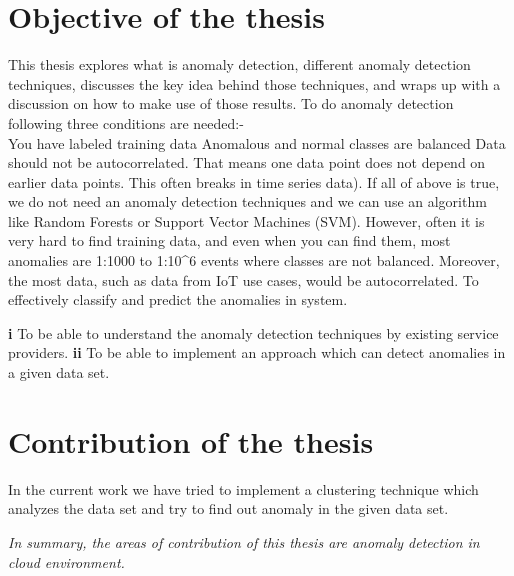 \section{Objective of the thesis}
\label{objective}
This thesis explores what is anomaly detection, different anomaly detection techniques,  discusses the key idea behind those techniques, and wraps up with a discussion on how to make use of those results.\newline%
To do anomaly detection following three conditions are needed:-\\
You have labeled training data
Anomalous and normal classes are balanced 
Data should  not  be autocorrelated.  That means one data point does not depend on earlier data points. This often breaks in time series data).
If all of above is true, we do not need an anomaly detection techniques and we can use an algorithm like Random Forests or Support Vector Machines (SVM).
However, often it is very hard to find training data, and even when you can find them, most anomalies are 1:1000 to 1:10^6 events where classes are not balanced. Moreover, the most data, such as data from IoT use cases, would be autocorrelated.
To effectively classify and predict the anomalies in system.
\begin{itemize}
     \textendash\textbf{i} To be able to understand the anomaly detection techniques by existing service providers.
     \textendash\textbf{ii} To be able to implement an approach which can detect anomalies in a given data set.\\
\end{itemize}

%

%
%
%

\section{Contribution of the thesis}
In the current work we have tried to implement a clustering technique which analyzes the  data set and try to find out anomaly in the given data set.


\emph{In summary, the areas of contribution of this thesis are anomaly detection in cloud environment.}

